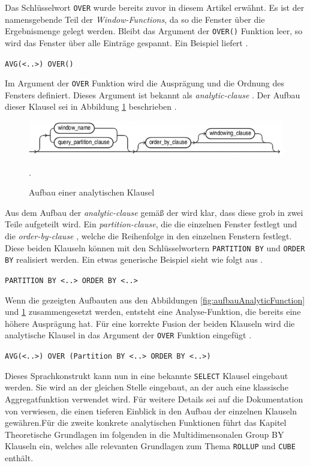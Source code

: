 Das Schlüsselwort \texttt{OVER} wurde bereits zuvor in diesem Artikel erwähnt.
Es ist der namensgebende Teil der \textit{Window-Functions}, da so die Fenster
über die Ergebnismenge gelegt werden. Bleibt das Argument der \texttt{OVER()}
Funktion leer, so wird das Fenster über alle Einträge gespannt. Ein Beispiel
liefert \citet[S. 36]{Nuijten2023}.
\begin{center}
	\texttt{AVG(<..>) OVER()}
\end{center}
Im Argument der \texttt{OVER} Funktion wird die Ausprägung und die Ordnung des Fensters
definiert. Dieses Argument ist bekannt als \textit{analytic-clause} \citep[vgl.][]{oracle}.
Der Aufbau dieser Klausel sei in Abbildung \ref{fig:aufbauAnalytischeKlausel} beschrieben
\citep[vgl.][K. 7]{oracle}.
\begin{figure}[h]
	\centering
	\includegraphics[scale=0.5]{img/aufbauAnalyticClausel.jpg}
	\caption{ Aufbau einer analytischen Klausel \citep[vgl.][K. 7]{oracle}}
	. \label{fig:aufbauAnalytischeKlausel}
\end{figure}
Aus dem Aufbau der \textit{analytic-clause} gemäß der \citet[K.~7]{oracle} wird klar,
dass diese grob in zwei Teile aufgeteilt wird. Ein \textit{partition-clause}, die
die einzelnen Fenster festlegt und die \textit{order-by-clause} , welche die
Reihenfolge in den einzelnen Fenstern festlegt. Diese beiden Klauseln können mit
den Schlüsselwortern \texttt{PARTITION BY} und \texttt{ORDER BY} realisiert werden.
Ein etwas generische Beispiel sieht wie folgt aus \citep[vgl.][K.7]{oracle}.
\begin{center}
	\texttt{PARTITION BY <..> ORDER BY <..>}
\end{center}
Wenn die gezeigten Aufbauten aus den Abbildungen
\ref{fig:aufbauAnalyticFunction} und \ref{fig:aufbauAnalytischeKlausel}
zusammengesetzt werden, entsteht eine Analyse-Funktion, die bereits eine höhere
Ausprägung hat. Für eine korrekte Fusion der beiden Klauseln wird die analytische
Klausel in das Argument der \texttt{OVER} Funktion eingefügt \citep[vgl.][S. 36]{Nuijten2023}.
\begin{center}
	\texttt{AVG(<..>) OVER (Partition BY <..> ORDER BY <..>)}
\end{center}
Dieses Sprachkonstrukt kann nun in eine bekannte \texttt{SELECT} Klausel eingebaut
werden. Sie wird an der gleichen Stelle eingebaut, an der auch eine klassische Aggregatfunktion
verwendet wird. Für weitere Details sei auf die Dokumentation von \citet[K.~7]{oracle}
verwiesen, die einen tieferen Einblick in den Aufbau der einzelnen Klauseln
gewähren.Für die zweite konkrete analytischen Funktionen führt das Kapitel
Theoretische Grundlagen im folgenden in die Multidimensonalen Group BY Klauseln
ein, welches alle relevanten Grundlagen zum Thema \texttt{ROLLUP} und \texttt{CUBE}
enthält.

